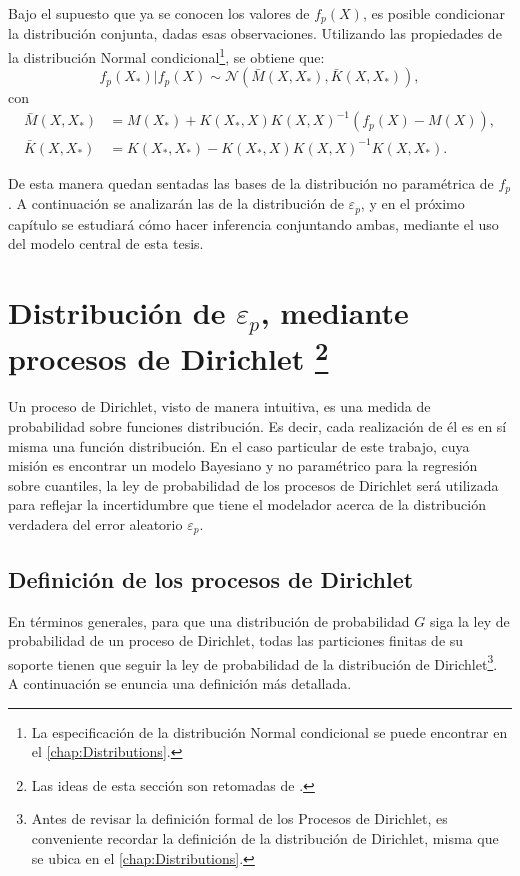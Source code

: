 Bajo el supuesto que ya se conocen los valores de $f_p(X)$, es posible condicionar la distribución conjunta, dadas esas observaciones. Utilizando las propiedades de la distribución Normal condicional\footnote{La especificaci\'on de la distribuci\'on Normal condicional se puede encontrar en el \autoref{chap:Distributions}.}, se obtiene que:
\begin{equation*}
    f_p(X_*)|f_p(X) 
    \sim \mathcal{N}
    (\bar{M}(X,X_*),\bar{K}(X,X_*)),
\end{equation*}
con
\begin{equation*}
\begin{aligned}
    \bar{M}(X,X_*) &= M(X_*) + K(X_*,X)K(X,X)^{-1}(f_p(X) - M(X)), \\
    \bar{K}(X,X_*) &= K(X_*,X_*) - K(X_*,X)K(X,X)^{-1}K(X,X_*).
\end{aligned}
\end{equation*}

De esta manera quedan sentadas las bases de la distribuci\'on no param\'etrica de $f_p$. A continuaci\'on se analizar\'an las de la distribuci\'on de $\varepsilon_p$, y en el pr\'oximo cap\'itulo se estudiar\'a c\'omo hacer inferencia conjuntando ambas, mediante el uso del modelo central de esta tesis.

\section[Distribuci\'on de $\varepsilon_p$, mediante procesos de Dirichlet]{
    Distribuci\'on de $\varepsilon_p$, mediante procesos de Dirichlet
    \footnote{Las ideas de esta secci\'on son retomadas de \cite{Yee_DirProc}.}
}

Un proceso de Dirichlet, visto de manera intuitiva, es una medida de probabilidad sobre funciones distribuci\'on. Es decir, cada realizaci\'on de él es en sí misma una funci\'on distribuci\'on. En el caso particular de este trabajo, cuya misi\'on es encontrar un modelo Bayesiano y no param\'etrico para la regresi\'on sobre cuantiles, la ley de probabilidad de los procesos de Dirichlet ser\'a utilizada para reflejar la incertidumbre que tiene el modelador acerca de la distribuci\'on verdadera del error aleatorio $\varepsilon_p$.

\subsection{Definici\'on de los procesos de Dirichlet}

En t\'erminos generales, para que una distribuci\'on de probabilidad $G$ siga la ley de probabilidad de un proceso de Dirichlet, todas las particiones finitas de su soporte tienen que seguir la ley de probabilidad de la distribuci\'on de Dirichlet\footnote{Antes de revisar la definici\'on formal de los Procesos de Dirichlet, es conveniente recordar la definici\'on de la distribuci\'on de Dirichlet, misma que se ubica en el \autoref{chap:Distributions}.}. A continuaci\'on se enuncia una definici\'on m\'as detallada.

